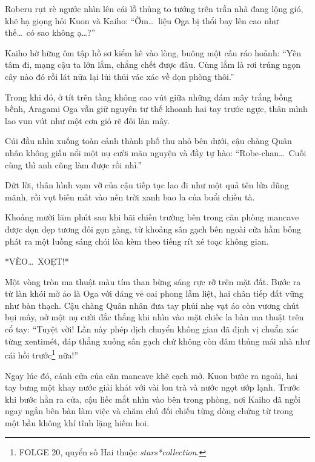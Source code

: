 \documentclass[../main.tex]{subfiles}
\begin{document}
Roberu rụt rè ngước nhìn lên cái lỗ thủng to tướng trên trần nhà đang lộng gió, khẽ hạ giọng hỏi Kuon và Kaiho: ``Ờm\dots\ liệu Oga bị thổi bay lên cao như thế\dots\ có sao không ạ\dots?''

Kaiho hờ hững ôm tập hồ sơ kiểm kê vào lòng, buông một câu ráo hoảnh: ``Yên tâm đi, mạng cậu ta lớn lắm, chẳng chết được đâu. Cùng lắm là rơi trúng ngọn cây nào đó rồi lát nữa lại lủi thủi vác xác về dọn phòng thôi.''

\ct

Trong khi đó, ở tít trên tầng không cao vút giữa những đám mây trắng bồng bềnh, Aragami Oga vẫn giữ nguyên tư thế khoanh hai tay trước ngực, thân mình lao vun vút như một cơn gió rẽ đôi làn mây.


Cúi đầu nhìn xuống toàn cảnh thành phố thu nhỏ bên dưới, cậu chàng Quân nhân không giấu nổi một nụ cười mãn nguyện và đầy tự hào:  ``Robe-chan\dots\ Cuối cùng thì anh cũng làm được rồi nhỉ.''

Dứt lời, thân hình vạm vỡ của cậu tiếp tục lao đi như một quả tên lửa dũng mãnh, rồi vụt biến mất vào nền trời xanh bao la của buổi chiều tà.

\omk

Khoảng mười lăm phút sau khi bãi chiến trường bên trong căn phòng mancave được dọn dẹp tương đối gọn gàng, từ khoảng sân gạch bên ngoài cửa hầm bỗng phát ra một luồng sáng chói lòa kèm theo tiếng rít xé toạc không gian.

*VÈO\dots\ XOẸT!*

Một vòng tròn ma thuật màu tím than bừng sáng rực rỡ trên mặt đất. Bước ra từ làn khói mờ ảo là Oga với dáng vẻ oai phong lẫm liệt, hai chân tiếp đất vững như bàn thạch. Cậu chàng Quân nhân đưa tay phủi nhẹ vạt áo còn vương chút bụi mây, nở một nụ cười đắc thắng khi nhìn vào mặt chiếc la bàn ma thuật trên cổ tay:  ``Tuyệt vời! Lần này phép dịch chuyển không gian đã định vị chuẩn xác từng xentimét, đáp thẳng xuống sân gạch chứ không còn đâm thủng mái nhà như cái hồi trước\footnote{{\humanist FOLGE 20}, quyển số Hai thuộc \textit{stars*collection}.} nữa!''

Ngay lúc đó, cánh cửa của căn mancave khẽ cạch mở. Kuon bước ra ngoài, hai tay bưng một khay nước giải khát với vài lon trà và nước ngọt ướp lạnh. Trước khi bước hẳn ra cửa, cậu liếc mắt nhìn vào bên trong phòng, nơi Kaiho đã ngồi ngay ngắn bên bàn làm việc và chăm chú đối chiếu từng dòng chứng từ trong một bầu không khí tĩnh lặng hiếm hoi.
\end{document}

